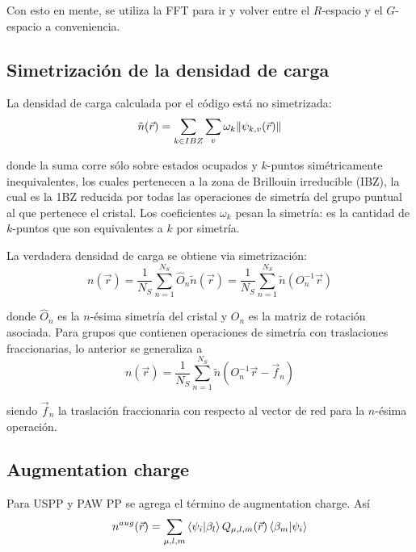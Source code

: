   Con esto en mente, se utiliza la FFT para ir y volver entre el $R$-espacio y el $G$-espacio a conveniencia.

\subsection{Simetrización de la densidad de carga}

  La densidad de carga calculada por el código está no simetrizada:
    $$\tilde{n} (\vec{r}) = \sum_{k\in IBZ} \sum_v \omega_k \norm{\psi_{k,v} (\vec{r})}$$

  donde la suma corre sólo sobre estados ocupados y $k$-puntos simétricamente inequivalentes, los cuales pertenecen a la zona de Brillouin irreducible (IBZ), la cual es la 1BZ reducida por todas las operaciones de simetría del grupo puntual al que pertenece el cristal. Los coeficientes $\omega_k$ pesan la simetría: es la cantidad de $k$-puntos que son equivalentes a $k$ por simetría.


  La verdadera densidad de carga se obtiene via simetrización:
    $$n(\vec{r}) = \frac{1}{N_S} \sum_{n=1}^{N_S} \hat{O}_n \tilde{n} (\vec{r}) = \frac{1}{N_S} \sum_{n=1}^{N_S}  \tilde{n} (O_n^{-1} \vec{r})$$

  donde $\hat{O}_n$ es la $n$-ésima simetría del cristal y $O_n$ es la matriz de rotación asociada. Para grupos que contienen operaciones de simetría con traslaciones fraccionarias, lo anterior se generaliza a
    $$n(\vec{r}) = \frac{1}{N_S} \sum_{n=1}^{N_S}  \tilde{n} (O_n^{-1} \vec{r} - \vec{f}_n)$$

  siendo $\vec{f}_n$ la traslación fraccionaria con respecto al vector de red para la $n$-ésima operación.


\subsection{Augmentation charge}

  Para USPP y PAW PP se agrega el término de augmentation charge. Así
    $$n^{aug} (\vec{r}) = \sum_{\mu,l,m} \braket{\psi_i}{\beta_l} Q_{\mu,l,m} (\vec{r}) \braket{\beta_m}{\psi_i}$$

